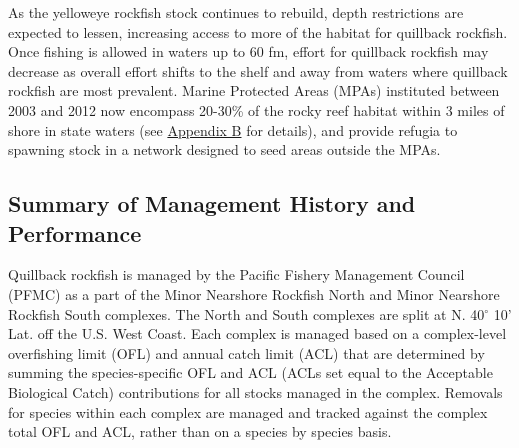 \documentclass[11pt,
  english,
  a4paper,
]{article}
\begin{document}
\leavevmode\tagmcend\tagstructend\par


As the yelloweye rockfish stock continues to rebuild, depth restrictions are expected to lessen, increasing access to more of the habitat for quillback rockfish. Once fishing is allowed in waters up to 60 fm, effort for quillback rockfish may decrease as overall effort shifts to the shelf and away from waters where quillback rockfish are most prevalent. Marine Protected Areas (MPAs) instituted between 2003 and 2012 now encompass 20-30\% of the rocky reef habitat within 3 miles of shore in state waters (see {\protect\hyperlink{append_b}{Appendix B}\leavevmode\tagmcend\tagstructend} for details), and provide refugia to spawning stock in a network designed to seed areas outside the MPAs.

\leavevmode\tagmcend\tagstructend\par


\hypertarget{summary-of-management-history-and-performance}{%
\subsection{Summary of Management History and Performance}\label{summary-of-management-history-and-performance}}

\leavevmode\tagmcend\tagstructend


Quillback rockfish is managed by the Pacific Fishery Management Council (PFMC) as a part of the Minor Nearshore Rockfish North and Minor Nearshore Rockfish South complexes. The North and South complexes are split at N. 40{\(^\circ\)\leavevmode\tagmcend\tagstructend} 10' Lat. off the U.S. West Coast. Each complex is managed based on a complex-level overfishing limit (OFL) and annual catch limit (ACL) that are determined by summing the species-specific OFL and ACL (ACLs set equal to the Acceptable Biological Catch) contributions for all stocks managed in the complex. Removals for species within each complex are managed and tracked against the complex total OFL and ACL, rather than on a species by species basis.

\leavevmode\tagmcend\tagstructend\par
\end{document}
